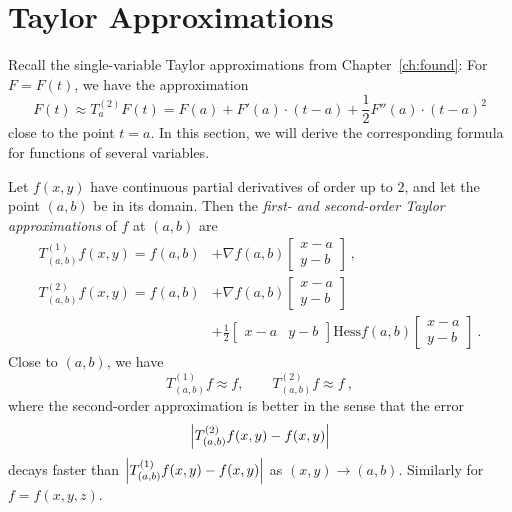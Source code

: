 \section{Taylor Approximations}

\begin{remark}
Recall the single-variable Taylor approximations from Chapter~\ref{ch:found}: For $F=F(t)$, we have the approximation
\[ F(t) \approx T_a^{(2)}F(t) = F(a) + F'(a)\cdot(t-a) + \frac{1}{2} F''(a)\cdot(t-a)^2 \]
close to the point $t=a$. In this section, we will derive the corresponding formula for functions of several variables.
\end{remark}

\begin{theorem}
Let $f(x,y)$ have continuous partial derivatives of order up to $2$, and let the point $(a,b)$ be in its domain. Then the \emph{first- and second-order Taylor approximations} of $f$ at $(a,b)$ are
\begin{equation}
\label{eq:TA}
\begin{split}
T_{(a,b)}^{(1)} f (x,y) = 
f(a,b) & + \nabla f (a,b) \begin{bmatrix} x-a \\ y-b \end{bmatrix} \:, \\
T_{(a,b)}^{(2)} f (x,y) = 
f(a,b) & + \nabla f (a,b) \begin{bmatrix} x-a \\ y-b \end{bmatrix} \\
 & + \frac{1}{2} \begin{bmatrix} x-a & y-b \end{bmatrix}
\mathrm{Hess} f (a,b) \begin{bmatrix} x-a \\ y-b \end{bmatrix} \:.
\end{split}
\end{equation}
Close to $(a,b)$, we have
\[ T_{(a,b)}^{(1)} f \approx f, \qquad T_{(a,b)}^{(2)} f \approx f \:, \]
where the second-order approximation is better in the sense that the error \[\left| T_{(a,b)}^{(2)}f(x,y)-f(x,y) \right|\]
decays faster than $\left| T_{(a,b)}^{(1)}f(x,y)-f(x,y) \right|$ as $(x,y)\to(a,b)$. Similarly for $f=f(x,y,z)$.
\end{theorem}

